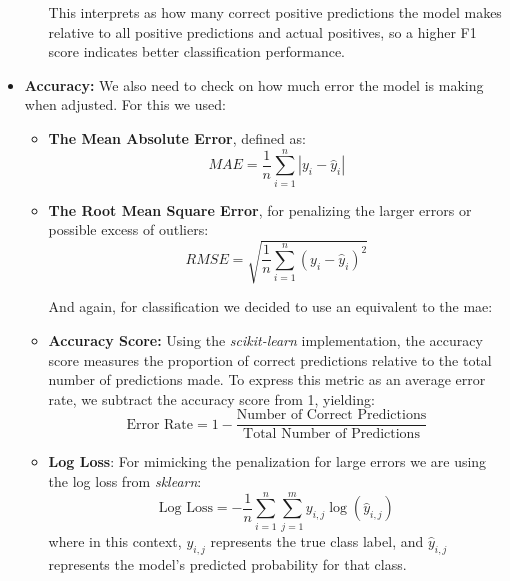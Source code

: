 \documentclass[11pt,english,a4paper,hidelinks]{book}
\begin{document}
\begin{itemize}
\begin{itemize}
        \vspace{0.05cm} This interprets as how many correct positive predictions the model makes relative to all positive predictions and actual positives, so a higher F1 score indicates better classification performance.
    \end{itemize}
    \item \textbf{Accuracy:} We also need to check on how much error the model is making when adjusted. For this we used:
    \begin{itemize}
        \item \textbf{The Mean Absolute Error}, defined as:
            \begin{equation}
                MAE = \frac{1}{n} \sum_{i=1}^{n} |y_i - \hat{y}_i|
            \end{equation}
        \item \textbf{The Root Mean Square Error}, for penalizing the larger errors or possible excess of outliers:
            \begin{equation}
                RMSE = \sqrt{\frac{1}{n} \sum_{i=1}^{n} {(y_i - \hat{y}_i)}^2}
            \end{equation}

        And again, for classification we decided to use an equivalent to the \acrshort{mae}:
        \item \textbf{Accuracy Score:} Using the \textit{scikit-learn} implementation, the accuracy score measures the proportion of correct predictions relative to the total number of predictions made. To express this metric as an average error rate, we subtract the accuracy score from 1, yielding:
            \begin{equation}
            \text{Error Rate} = 1 - \frac{\text{Number of Correct Predictions}}{\text{Total Number of Predictions}}
            \end{equation}
        \item \textbf{Log Loss}: For mimicking the penalization for large errors we are using the log loss from \textit{sklearn}:
        \begin{equation} 
            \text{Log Loss} = -\frac{1}{n} \sum_{i=1}^{n} \sum_{j=1}^{m} y_{i,j} \log(\hat{y}_{i,j})
        \end{equation}
       where in this context, \(y_{i,j}\) represents the true class label, and \(\hat{y}_{i,j}\) represents the model's predicted probability for that class.
       
    \end{itemize}
\end{itemize}
\end{document}
